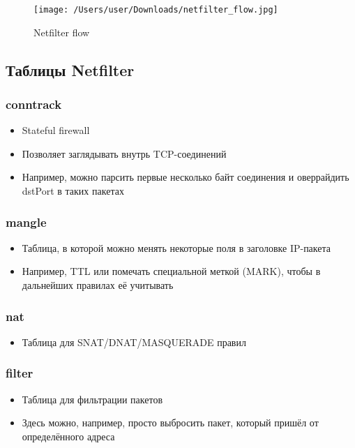 \begin{figure}[H]
  \centering
  \texttt{[image: /Users/user/Downloads/netfilter\_flow.jpg]}
  \caption{Netfilter flow}
  \label{fig:netfilter}
\end{figure}

  \subsection{Таблицы Netfilter}
    \subsubsection{conntrack}
      \begin{itemize}
        \item Stateful firewall
        \item Позволяет заглядывать внутрь TCP-соединений
        \item Например, можно парсить первые несколько байт соединения и оверрайдить dstPort в таких пакетах
      \end{itemize}
    
    \subsubsection{mangle}
      \begin{itemize}
        \item Таблица, в которой можно менять некоторые поля в заголовке IP-пакета
        \item Например, TTL или помечать специальной меткой (MARK), чтобы в дальнейших правилах её учитывать
      \end{itemize}
    
    \subsubsection{nat}
      \begin{itemize}
        \item Таблица для SNAT/DNAT/MASQUERADE правил
      \end{itemize}
    
    \subsubsection{filter}
      \begin{itemize}
        \item Таблица для фильтрации пакетов
        \item Здесь можно, например, просто выбросить пакет, который пришёл от определённого адреса
      \end{itemize}
  
